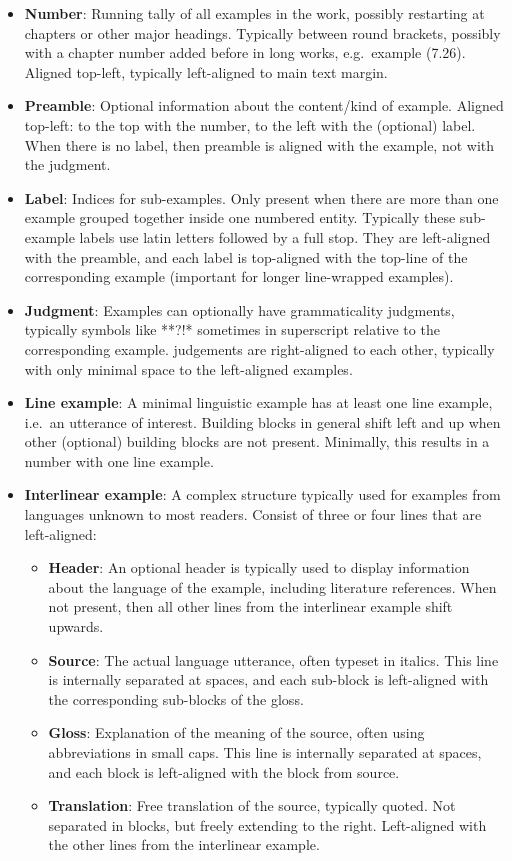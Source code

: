 \documentclass[
]{article}
\providecommand{\tightlist}{%
  \setlength{\itemsep}{0pt}\setlength{\parskip}{0pt}}
\begin{document}
\begin{itemize}
\tightlist
\item
  \textbf{Number}: Running tally of all examples in the work, possibly
  restarting at chapters or other major headings. Typically between
  round brackets, possibly with a chapter number added before in long
  works, e.g.~example (7.26). Aligned top-left, typically left-aligned
  to main text margin.
\item
  \textbf{Preamble}: Optional information about the content/kind of
  example. Aligned top-left: to the top with the number, to the left
  with the (optional) label. When there is no label, then preamble is
  aligned with the example, not with the judgment.
\item
  \textbf{Label}: Indices for sub-examples. Only present when there are
  more than one example grouped together inside one numbered entity.
  Typically these sub-example labels use latin letters followed by a
  full stop. They are left-aligned with the preamble, and each label is
  top-aligned with the top-line of the corresponding example (important
  for longer line-wrapped examples).
\item
  \textbf{Judgment}: Examples can optionally have grammaticality
  judgments, typically symbols like **?!* sometimes in superscript
  relative to the corresponding example. judgements are right-aligned to
  each other, typically with only minimal space to the left-aligned
  examples.
\item
  \textbf{Line example}: A minimal linguistic example has at least one
  line example, i.e.~an utterance of interest. Building blocks in
  general shift left and up when other (optional) building blocks are
  not present. Minimally, this results in a number with one line
  example.
\item
  \textbf{Interlinear example}: A complex structure typically used for
  examples from languages unknown to most readers. Consist of three or
  four lines that are left-aligned:

  \begin{itemize}
  \tightlist
  \item
    \textbf{Header}: An optional header is typically used to display
    information about the language of the example, including literature
    references. When not present, then all other lines from the
    interlinear example shift upwards.
  \item
    \textbf{Source}: The actual language utterance, often typeset in
    italics. This line is internally separated at spaces, and each
    sub-block is left-aligned with the corresponding sub-blocks of the
    gloss.
  \item
    \textbf{Gloss}: Explanation of the meaning of the source, often
    using abbreviations in small caps. This line is internally separated
    at spaces, and each block is left-aligned with the block from
    source.
  \item
    \textbf{Translation}: Free translation of the source, typically
    quoted. Not separated in blocks, but freely extending to the right.
    Left-aligned with the other lines from the interlinear example.
  \end{itemize}
\end{itemize}
\end{document}

